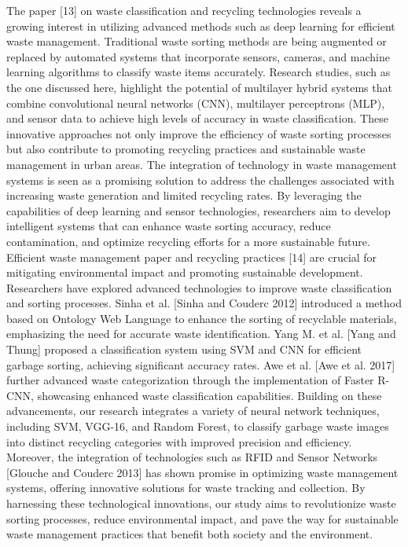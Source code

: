 \documentclass[12pt, English]{article}
\begin{document}
The paper [13] on waste classification and recycling technologies reveals a growing interest in utilizing advanced methods such as deep learning for efficient waste management. Traditional waste sorting methods are being augmented or replaced by automated systems that incorporate sensors, cameras, and machine learning algorithms to classify waste items accurately. Research studies, such as the one discussed here, highlight the potential of multilayer hybrid systems that combine convolutional neural networks (CNN), multilayer perceptrons (MLP), and sensor data to achieve high levels of accuracy in waste classification. These innovative approaches not only improve the efficiency of waste sorting processes but also contribute to promoting recycling practices and sustainable waste management in urban areas. The integration of technology in waste management systems is seen as a promising solution to address the challenges associated with increasing waste generation and limited recycling rates. By leveraging the capabilities of deep learning and sensor technologies, researchers aim to develop intelligent systems that can enhance waste sorting accuracy, reduce contamination, and optimize recycling efforts for a more sustainable future.\\

Efficient waste management paper and recycling practices [14] are crucial for mitigating environmental impact and promoting sustainable development. Researchers have explored advanced technologies to improve waste classification and sorting processes. Sinha et al. [Sinha and Couderc 2012] introduced a method based on Ontology Web Language to enhance the sorting of recyclable materials, emphasizing the need for accurate waste identification. Yang M. et al. [Yang and Thung] proposed a classification system using SVM and CNN for efficient garbage sorting, achieving significant accuracy rates. Awe et al. [Awe et al. 2017] further advanced waste categorization through the implementation of Faster R-CNN, showcasing enhanced waste classification capabilities. Building on these advancements, our research integrates a variety of neural network techniques, including SVM, VGG-16, and Random Forest, to classify garbage waste images into distinct recycling categories with improved precision and efficiency. Moreover, the integration of technologies such as RFID and Sensor Networks [Glouche and Couderc 2013] has shown promise in optimizing waste management systems, offering innovative solutions for waste tracking and collection. By harnessing these technological innovations, our study aims to revolutionize waste sorting processes, reduce environmental impact, and pave the way for sustainable waste management practices that benefit both society and the environment. \\
\end{document}
